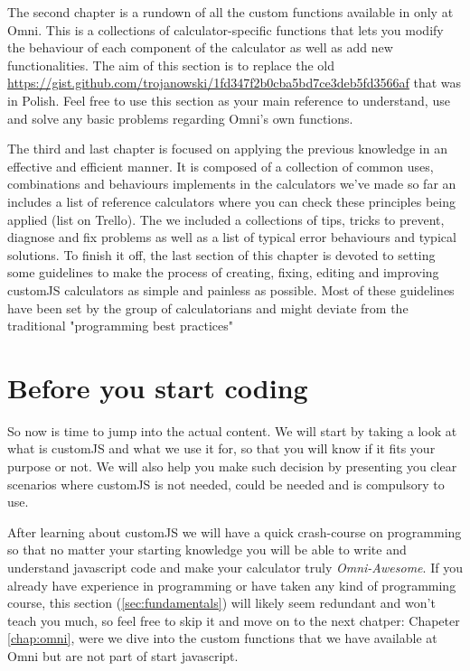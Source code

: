 \documentclass[11pt,a4paper,oldfontcommands]{memoir}
\begin{document}
The second chapter is a rundown of all the custom functions available in only at Omni. This is a collections of calculator-specific functions that lets you modify the behaviour of each component of the calculator as well as add new functionalities. The aim of this section is to replace the old \href{gist}{https://gist.github.com/trojanowski/1fd347f2b0cba5bd7ce3deb5fd3566af} that was in Polish. Feel free to use this section as your main reference to understand, use and solve any basic problems regarding Omni's own functions. 

The third and last chapter is focused on applying the previous knowledge in an effective and efficient manner. It is composed of a collection of common uses, combinations and behaviours implements in the calculators we've made so far an includes a list of reference calculators where you can check these principles being applied (list on Trello). The we included a collections of tips, tricks to prevent, diagnose and fix problems as well as a list of typical error behaviours and typical solutions. To finish it off, the last section of this chapter is devoted to setting some guidelines to make the process of creating, fixing, editing and improving customJS calculators as simple and painless as possible. Most of these guidelines have been set by the group of calculatorians and might deviate from the traditional "programming best practices"

\chapter{Before you start coding}
    \label{chap:b4}
So now is time to jump into the actual content. We will start by taking a look at what is customJS and what we use it for, so that you will know if it fits your purpose or not. We will also help you make such decision by presenting you clear scenarios where customJS is not needed, could be needed and is compulsory to use. 

After learning about customJS we will have a quick crash-course on programming so that no matter your starting knowledge you will be able to write and understand javascript code and make your calculator truly \textit{Omni-Awesome}\textsuperscript{\textregistered}. If you already have experience in programming or have taken any kind of programming course, this section (\ref{sec:fundamentals}) will likely seem redundant and won't teach you much, so feel free to skip it and move on to the next chatper: Chapeter \ref{chap:omni}, were we dive into the custom functions that we have available at Omni but are not part of start javascript.
    
\end{document}
